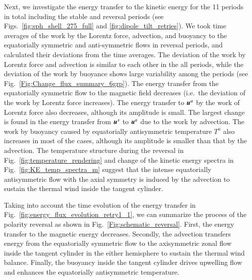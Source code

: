 Next, we investigate the energy transfer to the kinetic energy for the 11 periods in total including the stable and reversal periods (see Figs.\ \ref{fig:sph_shell_275_full} and \ref{fig:dipole_tilt_retries}).
We took time averages of the work by the Lorentz force, advection, and buoyancy to the equatorially symmetric and anti-symmetric flows in reversal periods, and calculated their deviations from the time averages.
The deviation of the work by Lorentz force and advection is similar to each other in the all periods, while the deviation of the work by buoyance shows large variability among the periods (see Fig.~\ref{Fig:Change_flux_summary_6grp}).
The energy transfer from the equatorially symmetric flow to the magnetic field decreases (i.e.\ the deviation of the work by Lorentz force increases). 
The energy transfer to $\mbox{\boldmath$u$}^a$ by the work of Lorentz force also decreases, although its amplitude is small.
The largest change is found in the energy transfer from $\mbox{\boldmath$u$}^s$ to $\mbox{\boldmath$u$}^a$ due to the work by advection. 
The work by buoyancy caused by equatorially antisymmetric temperature $T^{a}$ also increases in most of the cases, although its amplitude is smaller than that by the advection. 
The temperature structure during the reversal in Fig.~\ref{fig:temperature_rendering} and change of the kinetic energy spectra in Fig.~\ref{fig:KE_temp_spectra_m} suggest that the intense equatorially antisymmetric flow with the axial symmetry is induced by the advection to sustain the thermal wind inside the tangent cylinder. 

Taking into account the time evolution of the energy transfer in Fig.~\ref{fig:energy_flux_evolution_retry1_1}, we can summarize the process of the polarity reversal as shown in Fig.~\ref{Fig:schematic_reversal}. 
First, the energy transfer to the magnetic energy decreases. 
Secondly, the advection transfers energy from the equatorially symmetric flow to the axisymmetric zonal flow inside the tangent cylinder in the either hemisphere to sustain the thermal wind balance. 
Finally, the buoyancy inside the tangent cylinder drives upwelling flow and enhances the equatorially antisymmetric temperature.

